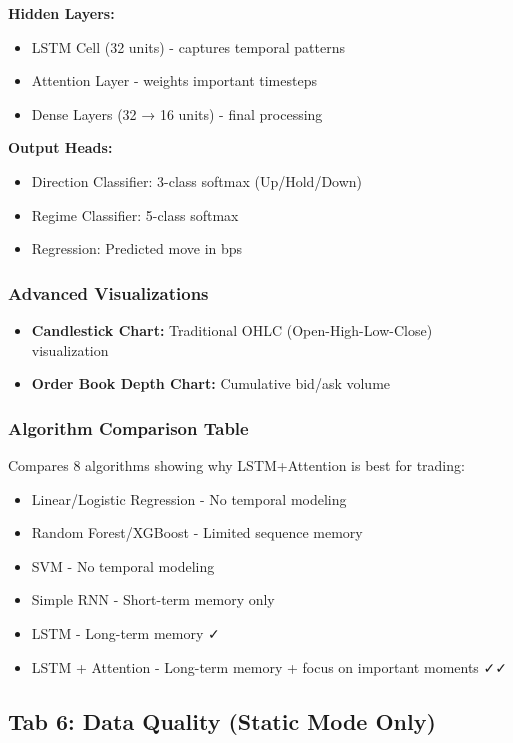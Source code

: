 \documentclass[12pt,a4paper]{article}
\begin{document}
\textbf{Hidden Layers:}
\begin{itemize}
    \item LSTM Cell (32 units) - captures temporal patterns
    \item Attention Layer - weights important timesteps
    \item Dense Layers (32 → 16 units) - final processing
\end{itemize}

\textbf{Output Heads:}
\begin{itemize}
    \item Direction Classifier: 3-class softmax (Up/Hold/Down)
    \item Regime Classifier: 5-class softmax
    \item Regression: Predicted move in bps
\end{itemize}

\subsubsection{Advanced Visualizations}
\begin{itemize}
    \item \textbf{Candlestick Chart:} Traditional OHLC (Open-High-Low-Close) visualization
    \item \textbf{Order Book Depth Chart:} Cumulative bid/ask volume
\end{itemize}

\subsubsection{Algorithm Comparison Table}
Compares 8 algorithms showing why LSTM+Attention is best for trading:
\begin{itemize}
    \item Linear/Logistic Regression - No temporal modeling
    \item Random Forest/XGBoost - Limited sequence memory
    \item SVM - No temporal modeling
    \item Simple RNN - Short-term memory only
    \item LSTM - Long-term memory ✓
    \item LSTM + Attention - Long-term memory + focus on important moments ✓✓
\end{itemize}

\subsection{Tab 6: Data Quality (Static Mode Only)}
\end{document}
